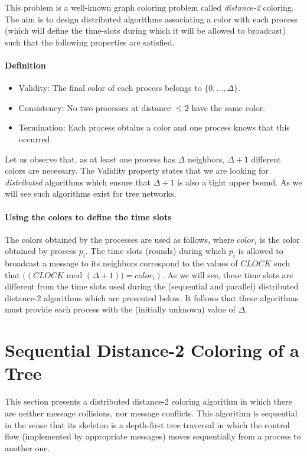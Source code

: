 \documentclass[11pt,english]{article}
\newcommand{\CLOCK}{\mathit{CLOCK}}
\begin{document}
This problem is a well-known graph coloring problem called 
{\it distance-2} coloring. The aim is to design distributed algorithms
associating a color with each process (which will define the 
time-slots during which it  will be allowed to broadcast) such 
that the following properties are satisfied. 


\paragraph{Definition}
\begin{itemize}
\vspace{-0.2cm}
\item Validity: 
The final color of each process belongs to $\{0,..., \Delta\}$. 
\vspace{-0.2cm}
\item Consistency: 
No two processes at distance $\leq 2$ have the same color.  
\vspace{-0.2cm}
\item Termination: Each process obtains a color and one process knows that 
this occurred. 
\end{itemize}
Let us observe that, as at least one process has $\Delta$ neighbors, 
$\Delta+1$ different  colors are necessary.  The Validity property
states that we are looking for {\it distributed} algorithms which ensure
that $\Delta+1$ is also a tight upper bound. As we will see such algorithms 
exist for tree networks.  

\paragraph{Using the colors to define the time slots}
The colors obtained by the processes are used as follows, where
$color_i$ is the color obtained by process $p_i$.  The time slots
(rounds) during which $p_i$ is allowed to broadcast a message to its
neighbors correspond to the values of $\CLOCK$ such that $\big((\CLOCK
\mbox{ mod } (\Delta +1)\big)= color_i)$.  As we will see, these time
slots are different from the time slots used during the (sequential
and parallel) distributed distance-2 algorithms which are presented
below. It follows that these algorithms must provide each process with
the (initially unknown) value of $\Delta$.



\section{Sequential Distance-2  Coloring of a Tree}
\label{sec:sequential-d2-tree-algorithm}
This section presents a distributed distance-2 coloring algorithm in
which there are neither message collisions, nor message conflicts.
This algorithm is sequential in the sense that its skeleton is a
depth-first tree traversal in which the control flow (implemented by
appropriate messages) moves sequentially from a process to another one. 
\end{document}
